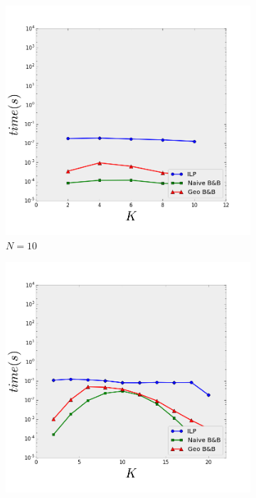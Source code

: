 \begin{figure}[t] 
  \begin{subfigure}[b]{0.4\linewidth}
    \centering
    \includegraphics[width=0.9\linewidth]{Pictures/n10} 
    \caption{$N=10$} 
    \label{fig:fixed_n:a} 
    \vspace{4ex}
  \end{subfigure}%
  \begin{subfigure}[b]{0.4\linewidth}
    \centering
    \includegraphics[width=0.9\linewidth]{Pictures/n20} 

\end{subfigure}
\end{figure}
